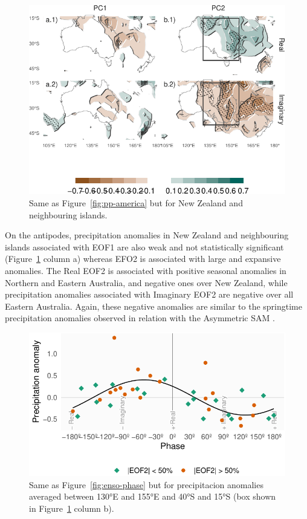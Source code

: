 \documentclass[smallextended]{svjour3}       %
\begin{document}
\begin{figure}
\centering
\includegraphics{../figures/pp-oceania-1.pdf}
\caption{\label{fig:pp-oceania}Same as Figure~\ref{fig:pp-america} but for New Zealand and neighbouring islands.}
\end{figure}

On the antipodes, precipitation anomalies in New Zealand and neighbouring islands associated with EOF1 are also weak and not statistically significant (Figure~\ref{fig:pp-oceania} column a) whereas EFO2 is associated with large and expansive anomalies. The Real EOF2 is associated with positive seasonal anomalies in Northern and Eastern Australia, and negative ones over New Zealand, while precipitation anomalies associated with Imaginary EOF2 are negative over all Eastern Australia. Again, these negative anomalies are similar to the springtime precipitation anomalies observed in relation with the Asymmetric SAM \citep{campitelli2021}.



\begin{figure}
\centering
\includegraphics{../figures/australia-pp-phase-1.pdf}
\caption{\label{fig:australia-pp-phase}Same as Figure~\ref{fig:enso-phase} but for precipitacion anomalies averaged between 130°E and 155°E and 40°S and 15°S (box shown in Figure~\ref{fig:pp-oceania} column b).}
\end{figure}
\end{document}
